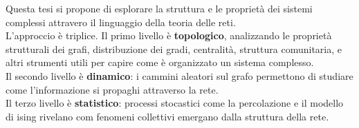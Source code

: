 \begin{boxb}{}
Questa tesi si propone di esplorare la struttura e le proprietà dei sistemi complessi attravero il linguaggio della teoria delle reti.\\
L'approccio è triplice. Il primo livello è \textbf{topologico}, analizzando le proprietà strutturali dei grafi, distribuzione dei gradi, centralità, struttura comunitaria, e altri strumenti utili per capire come è organizzato un sistema complesso. \\
Il secondo livello è \textbf{dinamico}: i cammini aleatori sul grafo permettono di studiare come l'informazione si propaghi attraverso la rete. \\
Il terzo livello è \textbf{statistico}: processi stocastici come la percolazione e il modello di ising rivelano com fenomeni collettivi emergano dalla struttura della rete.
\end{boxb}
